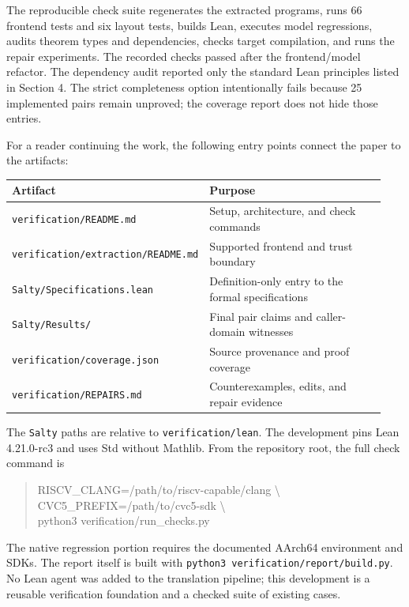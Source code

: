 \documentclass[11pt]{article}
\newcommand{\code}[1]{{\small\texttt{#1}}}
\begin{document}
The reproducible check suite regenerates the extracted programs, runs 66 frontend tests and six layout tests, builds Lean, executes model regressions, audits theorem types and dependencies, checks target compilation, and runs the repair experiments. The recorded checks passed after the frontend/model refactor. The dependency audit reported only the standard Lean principles listed in Section 4. The strict completeness option intentionally fails because 25 implemented pairs remain unproved; the coverage report does not hide those entries.

For a reader continuing the work, the following entry points connect the paper to the artifacts:
\begin{center}\small
\begin{tabular}{@{}p{0.43\linewidth}p{0.51\linewidth}@{}}
\toprule
Artifact & Purpose \\
\midrule
\code{verification/README.md} & Setup, architecture, and check commands \\
\code{verification/extraction/README.md} & Supported frontend and trust boundary \\
\code{Salty/Specifications.lean} & Definition-only entry to the formal specifications \\
\code{Salty/Results/} & Final pair claims and caller-domain witnesses \\
\code{verification/coverage.json} & Source provenance and proof coverage \\
\code{verification/REPAIRS.md} & Counterexamples, edits, and repair evidence \\
\bottomrule
\end{tabular}
\end{center}
The \code{Salty} paths are relative to \code{verification/lean}. The development pins Lean 4.21.0-rc3 and uses Std without Mathlib. From the repository root, the full check command is
\begin{quote}\small\ttfamily
RISCV\_CLANG=/path/to/riscv-capable/clang \textbackslash{}\\
CVC5\_PREFIX=/path/to/cvc5-sdk \textbackslash{}\\
python3 verification/run\_checks.py
\end{quote}
The native regression portion requires the documented AArch64 environment and SDKs. The report itself is built with \code{python3 verification/report/build.py}. No Lean agent was added to the translation pipeline; this development is a reusable verification foundation and a checked suite of existing cases.
\end{document}
